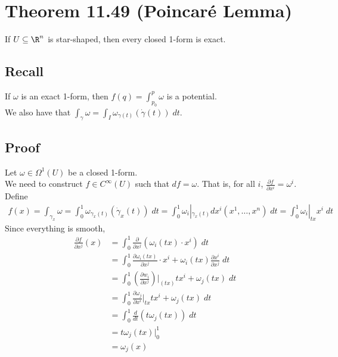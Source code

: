 \documentclass[11pt]{article}
\begin{document}
\section*{Theorem 11.49 (Poincaré Lemma)}
\label{sec:orgd2251db}
If \(U\subseteq\R^{n}\) is star-shaped, then every closed 1-form is exact.\\
\subsection*{Recall}
\label{sec:orgd6773e7}
If \(\omega\) is an exact 1-form, then \(f(q)=\int_{p_{0}}^{p}\omega\) is a potential.\\
We also have that \(\int_{\gamma}\omega=\int_{I}\omega_{\gamma(t)}(\dot{\gamma}(t))\;dt\).\\
\subsection*{Proof}
\label{sec:orgf256ed4}
Let \(\omega\in\Omega^{1}(U)\) be a closed 1-form.\\
We need to construct \(f\in C^{\infty}(U)\) such that \(df=\omega\). That is, for all \(i\), \(\frac{\partial f}{\partial x^{i}}=\omega^{i}\). Define\\
\begin{align*}
  f(x)
  =\int_{\gamma_{x}}\omega
  =\int_{0}^{1}\omega_{\gamma_{x}(t)}(\dot{\gamma}_{x}(t))\;dt
  =\int_{0}^{1}\omega_{i}|_{\gamma_{x}(t)}dx^{i}(x^{1},\ldots,x^{n})\;dt
  =\int_{0}^{1}\omega_{i}|_{tx}x^{i}\;dt
\end{align*}
Since everything is smooth,\\
\begin{align*}
  \frac{\partial f}{\partial x^{j}}(x)
  &=\int_{0}^{1}\frac{\partial}{\partial x^{j}}(\omega_{i}(tx)\cdot x^{i})\;dt \\
  &=\int_{0}^{1}\frac{\partial\omega_{i}(tx)}{\partial x^{j}}\cdot x^{i}+\omega_{i}(tx)\frac{\partial x^{i}}{\partial x^{j}}\;dt \\
  &=\int_{0}^{1}\left( \frac{\partial w_{i}}{\partial x^{j}} \right)\Big|_{(tx)}tx^{i}+\omega_{j}(tx)\;dt \\
  &=\int_{0}^{1}\frac{\partial\omega_{j}}{\partial x^{i}}\Big|_{tx}tx^{i}+\omega_{j}(tx)\;dt \\
  &=\int_{0}^{1}\frac{d}{dt}\left( t\omega_{j}(tx) \right)\;dt \\
  &=t\omega_{j}(tx)|_{0}^{1} \\
  &=\omega_{j}(x)
\end{align*}
\end{document}
